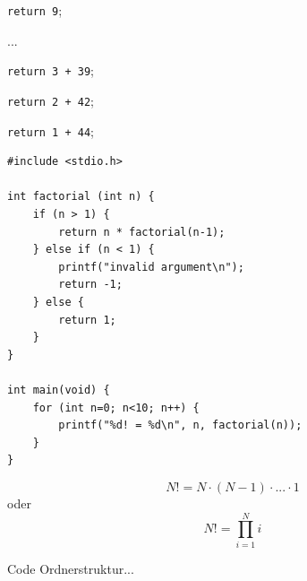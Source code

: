
\begin{frame}
%
\scriptsize
\begin{codebox}
\begin{codebox}
\begin{codebox}
\begin{codebox}[Rekursionsstufe 3-7]
\begin{codebox}
\texttt{return 9};
\end{codebox}
...
\end{codebox}
\texttt{return 3 + 39};
\end{codebox}
\texttt{return 2 + 42};
\end{codebox}
\texttt{return 1 + 44};
\end{codebox}
%
\end{frame}


\begin{frame}[t,fragile]%
%
\begin{codebox}
\begin{verbatim}
#include <stdio.h>

int factorial (int n) {
    if (n > 1) {
        return n * factorial(n-1);
    } else if (n < 1) {
        printf("invalid argument\n"); 
        return -1;
    } else {
        return 1;
    }
}

int main(void) {
    for (int n=0; n<10; n++) {
        printf("%d! = %d\n", n, factorial(n));
    }
}
\end{verbatim}
\end{codebox}
%
\begin{hintbox}
\[N! = N \cdot (N-1) \cdot ... \cdot 1 \]
oder
\[N! = \prod_{i=1}^{N} i \]
\end{hintbox}
\end{frame}


\begin{frame}
%
\begin{center}
Code Ordnerstruktur...
\end{center}
%
\end{frame}
